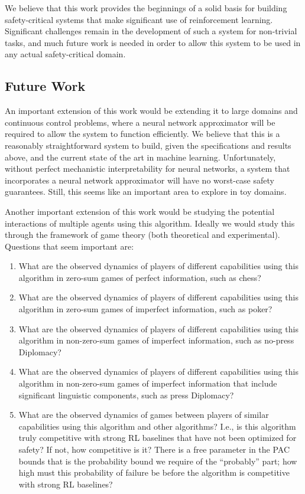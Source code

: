 \documentclass[11pt]{article}
\begin{document}
We believe that this work provides the beginnings of a solid basis for
building safety-critical systems that make significant use of
reinforcement learning. Significant challenges remain in the
development of such a system for non-trivial tasks, and much future
work is needed in order to allow this system to be used in any actual
safety-critical domain.

\subsection{Future Work}

An important extension of this work would be extending it to large
domains and continuous control problems, where a neural network
approximator will be required to allow the system to function
efficiently. We believe that this is a reasonably straightforward
system to build, given the specifications and results above, and the
current state of the art in machine learning. Unfortunately, without
perfect mechanistic interpretability for neural networks, a system
that incorporates a neural network approximator will have no
worst-case safety guarantees. Still, this seems like an important area
to explore in toy domains.

Another important extension of this work would be studying the
potential interactions of multiple agents using this algorithm.
Ideally we would study this through the framework of game theory (both
theoretical and experimental). Questions that seem important are:
\begin{enumerate}
\item What are the observed dynamics of players of different
  capabilities using this algorithm in zero-sum games of perfect
  information, such as chess?
\item What are the observed dynamics of players of different
  capabilities using this algorithm in zero-sum games of imperfect
  information, such as poker?
\item What are the observed dynamics of players of different
  capabilities using this algorithm in non-zero-sum games of imperfect
  information, such as no-press Diplomacy?
\item What are the observed dynamics of players of different
  capabilities using this algorithm in non-zero-sum games of imperfect
  information that include significant linguistic components, such as
  press Diplomacy?
\item What are the observed dynamics of games between players of
  similar capabilities using this algorithm and other algorithms?
  I.e., is this algorithm truly competitive with strong RL baselines
  that have not been optimized for safety? If not, how competitive is
  it? There is a free parameter in the PAC bounds that is the
  probability bound we require of the ``probably'' part; how high must
  this probability of failure be before the algorithm is competitive
  with strong RL baselines?
\end{enumerate}
\end{document}
